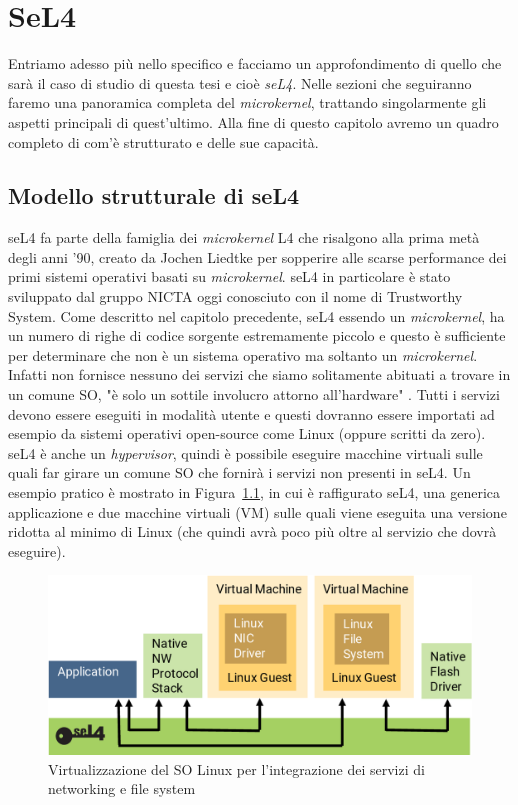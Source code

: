 \chapter{SeL4}
Entriamo adesso più nello specifico e facciamo un approfondimento di quello che sarà il caso di studio di questa tesi e cioè \textit{seL4}. Nelle sezioni che seguiranno faremo una panoramica completa del \textit{microkernel}, trattando singolarmente gli aspetti principali di quest'ultimo. Alla fine di questo capitolo avremo un quadro completo di com'è strutturato e delle sue capacità.

\section{Modello strutturale di seL4}
seL4 fa parte della famiglia dei \textit{microkernel} L4 che risalgono alla prima metà degli anni '90, creato da Jochen Liedtke per sopperire alle scarse performance dei primi sistemi operativi basati su \textit{microkernel}. seL4 in particolare è stato sviluppato dal gruppo NICTA oggi conosciuto con il nome di Trustworthy System.
Come descritto nel capitolo precedente, seL4 essendo un \textit{microkernel}, ha un numero di righe di codice sorgente estremamente piccolo e questo è sufficiente per determinare che non è un sistema operativo ma soltanto un \textit{microkernel}. Infatti non fornisce nessuno dei servizi che siamo solitamente abituati a trovare in un comune SO, "è solo un sottile involucro attorno all'hardware" \cite{sel4-whitepaper}. Tutti i servizi devono essere eseguiti in modalità utente e questi dovranno essere importati ad esempio da sistemi operativi open-source come Linux (oppure scritti da zero). seL4 è anche un \textit{hypervisor}, quindi è possibile eseguire macchine virtuali sulle quali far girare un comune SO che fornirà i servizi non presenti in seL4.
Un esempio pratico è mostrato in Figura~\ref{fig:Virtualizzazione}, in cui è raffigurato seL4, una generica applicazione e due macchine virtuali (VM) sulle quali viene eseguita una versione ridotta al minimo di Linux (che quindi avrà poco più oltre al servizio che dovrà eseguire).
\begin{figure}[h]
  \includegraphics[width=\linewidth]{img/seL4Hypervisor.png}
  \caption{Virtualizzazione del SO Linux per l'integrazione dei servizi di networking e file system}
  \label{fig:Virtualizzazione}
\end{figure}
